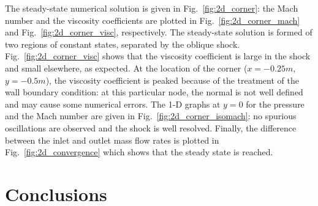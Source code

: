 \documentclass[preprint,10pt]{elsarticle}
\newcommand{\fig}[1]{Fig.~\ref{#1}}                      %
\begin{document}
%
The steady-state numerical solution is given in \fig{fig:2d_corner}: the Mach number and the viscosity coefficients are plotted in \fig{fig:2d_corner_mach} and \fig{fig:2d_corner_visc}, respectively. The steady-state solution is formed of two regions of constant states, separated by the oblique shock. \fig{fig:2d_corner_visc} shows that the viscosity coefficient is large in the shock and small elsewhere, as expected. At the location of the corner ($x=-0.25m$, $y=-0.5m$), the viscosity coefficient is peaked because of the treatment of the wall boundary condition: at this particular node, the normal is not well defined and may cause some numerical errors. The 1-D graphs at $y=0$ for the pressure and the Mach number are given in \fig{fig:2d_corner_isomach}: no spurious oscillations are observed and the shock is well resolved. Finally, the difference between the inlet and outlet mass flow rates is plotted in \fig{fig:2d_convergence} which shows that the steady state is reached. 

\section{Conclusions} \label{sec:ccl}
\end{document}

